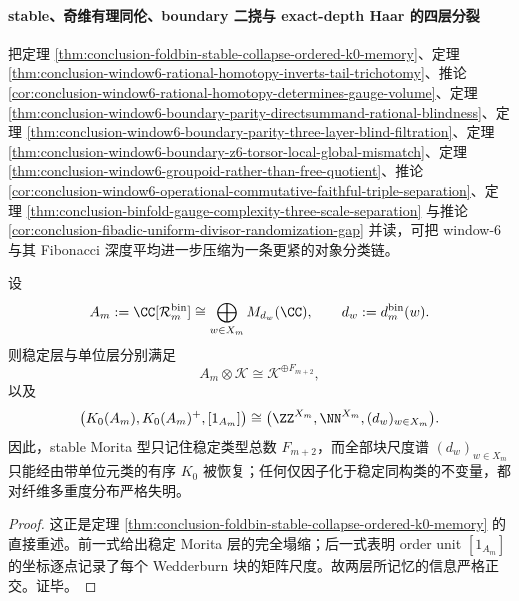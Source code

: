 \paragraph{stable、奇维有理同伦、boundary 二挠与 exact-depth Haar 的四层分裂}
把定理 \ref{thm:conclusion-foldbin-stable-collapse-ordered-k0-memory}、定理 \ref{thm:conclusion-window6-rational-homotopy-inverts-tail-trichotomy}、推论 \ref{cor:conclusion-window6-rational-homotopy-determines-gauge-volume}、定理 \ref{thm:conclusion-window6-boundary-parity-directsummand-rational-blindness}、定理 \ref{thm:conclusion-window6-boundary-parity-three-layer-blind-filtration}、定理 \ref{thm:conclusion-window6-boundary-z6-torsor-local-global-mismatch}、定理 \ref{thm:conclusion-window6-groupoid-rather-than-free-quotient}、推论 \ref{cor:conclusion-window6-operational-commutative-faithful-triple-separation}、定理 \ref{thm:conclusion-binfold-gauge-complexity-three-scale-separation} 与推论 \ref{cor:conclusion-fibadic-uniform-divisor-randomization-gap} 并读，可把 window-\(6\) 与其 Fibonacci 深度平均进一步压缩为一条更紧的对象分类链。

\begin{theorem}\label{thm:conclusion-window6-stable-orderunit-strict-orthogonality}
设
\[
A_m:=\CC[\mathcal R_m^{\mathrm{bin}}]\cong \bigoplus_{w\in X_m}M_{d_w}(\CC),
\qquad
d_w:=d_m^{\mathrm{bin}}(w).
\]
则稳定层与单位层分别满足
\[
A_m\otimes\mathcal K\cong \mathcal K^{\oplus F_{m+2}},
\]
以及
\[
\bigl(K_0(A_m),K_0(A_m)^+,[1_{A_m}]\bigr)
\cong
\bigl(\ZZ^{X_m},\NN^{X_m},(d_w)_{w\in X_m}\bigr).
\]
因此，stable Morita 型只记住稳定类型总数 \(F_{m+2}\)，而全部块尺度谱 \((d_w)_{w\in X_m}\) 只能经由带单位元类的有序 \(K_0\) 被恢复；任何仅因子化于稳定同构类的不变量，都对纤维多重度分布严格失明。
\end{theorem}
\begin{proof}
这正是定理 \ref{thm:conclusion-foldbin-stable-collapse-ordered-k0-memory} 的直接重述。前一式给出稳定 Morita 层的完全塌缩；后一式表明 order unit \([1_{A_m}]\) 的坐标逐点记录了每个 Wedderburn 块的矩阵尺度。故两层所记忆的信息严格正交。证毕。
\end{proof}

